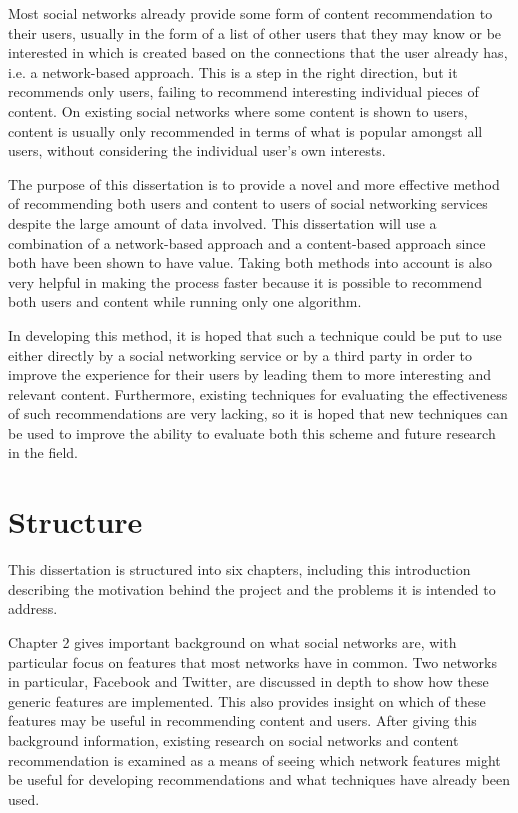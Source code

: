 Most social networks already provide some form of content recommendation to their users, usually in the form of a list of other users that they may know or be interested in which is created based on the connections that the user already has, i.e. a network-based approach. This is a step in the right direction, but it recommends only users, failing to recommend interesting individual pieces of content. On existing social networks where some content is shown to users, content is usually only recommended in terms of what is popular amongst all users, without considering the individual user's own interests.

The purpose of this dissertation is to provide a novel and more effective method of recommending both users and content to users of social networking services despite the large amount of data involved. This dissertation will use a combination of a network-based approach and a content-based approach since both have been shown to have value. Taking both methods into account is also very helpful in making the process faster because it is possible to recommend both users and content while running only one algorithm.

In developing this method, it is hoped that such a technique could be put to use either directly by a social networking service or by a third party in order to improve the experience for their users by leading them to more interesting and relevant content. Furthermore, existing techniques for evaluating the effectiveness of such recommendations are very lacking, so it is hoped that new techniques can be used to improve the ability to evaluate both this scheme and future research in the field.

\section{Structure}

This dissertation is structured into six chapters, including this introduction describing the motivation behind the project and the problems it is intended to address.

Chapter 2 gives important background on what social networks are, with particular focus on features that most networks have in common. Two networks in particular, Facebook and Twitter, are discussed in depth to show how these generic features are implemented. This also provides insight on which of these features may be useful in recommending content and users. After giving this background information, existing research on social networks and content recommendation is examined as a means of seeing which network features might be useful for developing recommendations and what techniques have already been used.

